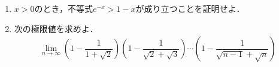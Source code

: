\documentclass[../../main.tex]{subfiles}
\begin{document}
\begin{enumerate}
  \item $x>0$のとき，不等式$e^{-x}>1-x$が成り立つことを証明せよ．
  \item 次の極限値を求めよ．
    \begin{align}
      \lim_{n\to\infty}\left(1-\dfrac{1}{1+\sqrt{2}}\right)\left(1-\dfrac{1}{\sqrt{2}+\sqrt{3}}\right)
      \cdots\left(1-\dfrac{1}{\sqrt{n-1}+\sqrt{n}}\right)
    \end{align}
\end{enumerate}
\end{document}
